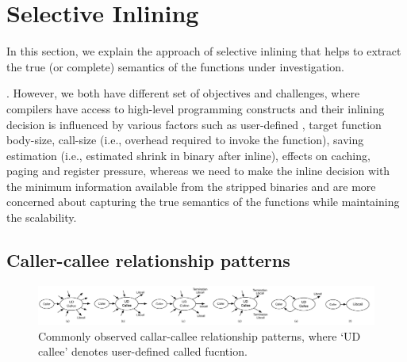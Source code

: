 \section{Selective Inlining}\label{sec:inline}
In this section, we explain the approach of selective inlining that helps to extract the true (or complete) semantics of the functions under investigation.


. However, we both have different set of objectives and challenges, where compilers have access to high-level programming constructs and their inlining decision is influenced by various factors such as user-defined , target function body-size, call-size (i.e., overhead required to invoke the function), saving estimation (i.e., estimated shrink in binary after inline), effects on caching, paging and register pressure, whereas we need to make the inline decision with the minimum information available from the stripped binaries and are more concerned about capturing the true semantics of the functions while maintaining the scalability.

\subsection{Caller-callee relationship patterns}

\begin{figure}[ht]
   \centering
  \includegraphics[width=\textwidth]{srj-figures/srj-caller-callee3.pdf}
  \caption{Commonly observed callar-callee relationship patterns, where `UD callee' denotes user-defined called fucntion.} \label{fig:caller-callee}
\end{figure}

